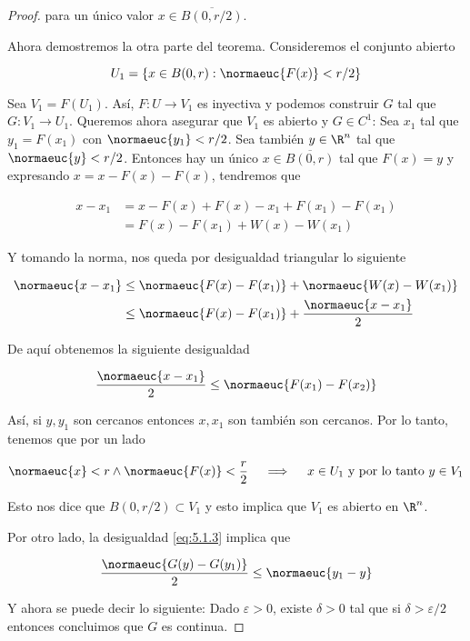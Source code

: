 \begin{proof}
    \noindent para un único valor $x \in \overline{B(0,r/2)}$.
    
    Ahora demostremos la otra parte del teorema. Consideremos el conjunto abierto
    
    \[
    U_1 = \{ x \in B(0,r) : \normaeuc{F(x)} < r/2\}
    \]
    
    Sea $V_1 = F(U_1)$. Así, $F: U \rightarrow V_1$ es inyectiva y podemos construir $G$ tal que $G: V_1 \rightarrow U_1$. Queremos ahora asegurar que $V_1$ es abierto y $G \in C^1$: Sea $x_1$ tal que $y_1 = F(x_1)$ con $\normaeuc{y_1} < r/2$. Sea también $y \in \R^n$ tal que $\normaeuc{y} < r/2$. Entonces hay un único $x \in \overline{B(0,r)}$ tal que $F(x) = y$ y expresando $x = x - F(x) - F(x)$, tendremos que
    
    \begin{align*}
        x - x_1 &= x - F(x) + F(x) - x_1 + F(x_1) - F(x_1) \\
            &= F(x) - F(x_1) + W(x) - W(x_1)
    \end{align*}
    
    Y tomando la norma, nos queda por desigualdad triangular lo siguiente
    
    \begin{align*}
        \normaeuc{x - x_1} &\leq \normaeuc{F(x) - F(x_1)} + \normaeuc{W(x) - W(x_1)} \\
            &\leq \normaeuc{F(x) - F(x_1)} + \frac{\normaeuc{x - x_1}}{2}
    \end{align*}
    
    De aquí obtenemos la siguiente desigualdad
    
    \begin{equation}\label{eq:5.1.3}
        \frac{\normaeuc{x-x_1}}{2} \leq \normaeuc{F(x_1) - F(x_2)}
    \end{equation}
    
    Así, si $y, y_1$ son cercanos entonces $x, x_1$ son también son cercanos. Por lo tanto, tenemos que por un lado
    
    \[
    \normaeuc{x} < r \wedge \normaeuc{F(x)} < \frac{r}{2} \quad \implies \quad x \in U_1 \text{~y por lo tanto $y \in V_1$}
    \]
    
    Esto nos dice que $B(0, r/2) \subset V_1$ y esto implica que $V_1$ es abierto en $\R^n$.
    
    Por otro lado, la desigualdad \ref{eq:5.1.3} implica que
    
    \[
    \frac{\normaeuc{G(y) - G(y_1)}}{2} \leq \normaeuc{y_1 - y}
    \]
    
    Y ahora se puede decir lo siguiente: Dado $\varepsilon > 0$, existe $\delta > 0$ tal que si $\delta > \varepsilon / 2$ entonces concluimos que $G$ es continua.
\end{proof}